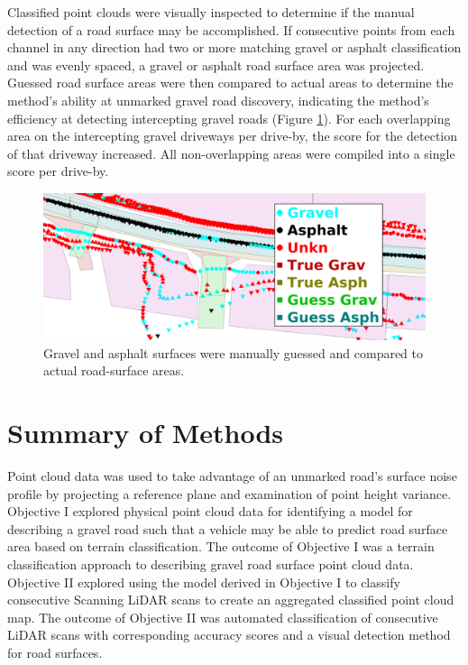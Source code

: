 \documentclass[numbered,pdftex]{ohio-etd}
\begin{document}
{{{{{				{Classified point clouds were visually inspected to determine if the manual detection of a road surface may be accomplished. If consecutive points from each channel in any direction had two or more matching gravel or asphalt classification and was evenly spaced, a gravel or asphalt road surface area was projected. Guessed road surface areas were then compared to actual areas to determine the method's ability at unmarked gravel road discovery, indicating the method's efficiency at detecting intercepting gravel roads (Figure \ref{fig:rm_db_4_toc}). For each overlapping area on the intercepting gravel driveways per drive-by, the score for the detection of that driveway increased. All non-overlapping areas were compiled into a single score per drive-by.}	
				
				\begin{figure}[H]
					\centering
					\includegraphics[width=0.9\linewidth]{Defense_Images/rm_db_4_ToC_22}
					\caption[Projected Guess vs Truth]{Gravel and asphalt surfaces were manually guessed and compared to actual road-surface areas. }
					\label{fig:rm_db_4_toc}
				\end{figure}	
	
			}
		
		} %

	} %
	
} %


\newpage
	
	
	\section{Summary of Methods}\label{sec:summary-of-methods}
	{
		
		{Point cloud data was used to take advantage of an unmarked road's surface noise profile by projecting a reference plane and examination of point height variance. Objective I explored physical point cloud data for identifying a model for describing a gravel road such that a vehicle may be able to predict road surface area based on terrain classification. The outcome of Objective I was a terrain classification approach to describing gravel road surface point cloud data. Objective II explored using the model derived in Objective I to classify consecutive Scanning LiDAR scans to create an aggregated classified point cloud map. The outcome of Objective II was automated classification of consecutive LiDAR scans with corresponding accuracy scores and a visual detection method for road surfaces.}
		 
}}
\end{document}
